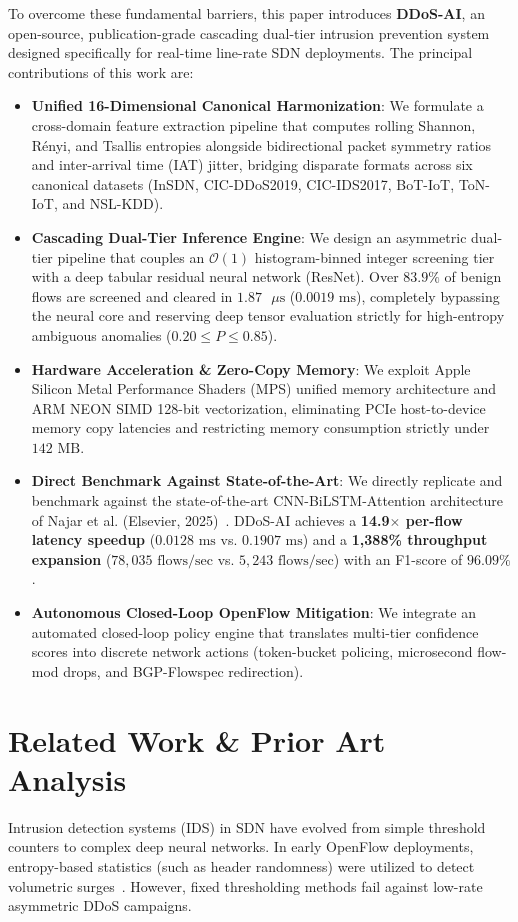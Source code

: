 \documentclass[journal]{IEEEtran}
\begin{document}
To overcome these fundamental barriers, this paper introduces \textbf{DDoS-AI}, an open-source, publication-grade cascading dual-tier intrusion prevention system designed specifically for real-time line-rate SDN deployments. The principal contributions of this work are:
\begin{itemize}
    \item \textbf{Unified 16-Dimensional Canonical Harmonization}: We formulate a cross-domain feature extraction pipeline that computes rolling Shannon, Rényi, and Tsallis entropies alongside bidirectional packet symmetry ratios and inter-arrival time (IAT) jitter, bridging disparate formats across six canonical datasets (InSDN, CIC-DDoS2019, CIC-IDS2017, BoT-IoT, ToN-IoT, and NSL-KDD).
    \item \textbf{Cascading Dual-Tier Inference Engine}: We design an asymmetric dual-tier pipeline that couples an $\mathcal{O}(1)$ histogram-binned integer screening tier with a deep tabular residual neural network (ResNet). Over $83.9\%$ of benign flows are screened and cleared in $1.87\text{ }\mu\text{s}$ ($0.0019\text{ ms}$), completely bypassing the neural core and reserving deep tensor evaluation strictly for high-entropy ambiguous anomalies ($0.20 \le P \le 0.85$).
    \item \textbf{Hardware Acceleration \& Zero-Copy Memory}: We exploit Apple Silicon Metal Performance Shaders (MPS) unified memory architecture and ARM NEON SIMD 128-bit vectorization, eliminating PCIe host-to-device memory copy latencies and restricting memory consumption strictly under $142\text{ MB}$.
    \item \textbf{Direct Benchmark Against State-of-the-Art}: We directly replicate and benchmark against the state-of-the-art CNN-BiLSTM-Attention architecture of Najar et al. (Elsevier, 2025)~\cite{najar2025ddos}. DDoS-AI achieves a \textbf{14.9$\times$ per-flow latency speedup} ($0.0128\text{ ms}$ vs. $0.1907\text{ ms}$) and a \textbf{1,388\% throughput expansion} ($78,035\text{ flows/sec}$ vs. $5,243\text{ flows/sec}$) with an F1-score of $96.09\%$.
    \item \textbf{Autonomous Closed-Loop OpenFlow Mitigation}: We integrate an automated closed-loop policy engine that translates multi-tier confidence scores into discrete network actions (token-bucket policing, microsecond flow-mod drops, and BGP-Flowspec redirection).
\end{itemize}

\section{Related Work \& Prior Art Analysis}
Intrusion detection systems (IDS) in SDN have evolved from simple threshold counters to complex deep neural networks. In early OpenFlow deployments, entropy-based statistics (such as header randomness) were utilized to detect volumetric surges~\cite{elsayed2020insdn}. However, fixed thresholding methods fail against low-rate asymmetric DDoS campaigns.
\end{document}
